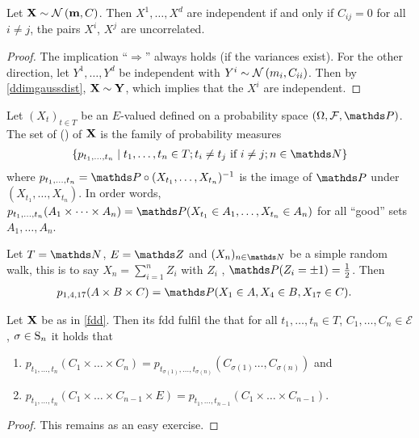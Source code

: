 \begin{prop}
	Let $\mathbf{X} \sim \mathcal{N}\left(\mathbf{m},C\right)$.
	Then $X^1, \dots, X^d$ are independent \RVs
	if and only if
	$C_{ij}=0$ for all $i\not = j$,
	\ie the pairs $X^i$, $X^j$ are uncorrelated.
\end{prop}
\begin{proof}
	The implication “$\Rightarrow$”
	always holds (if the variances exist).
	For the other direction,
	let $Y^1, \dots, Y^d$ be independent
	with $Y^i \sim \mathcal{N}\left(m_i,C_{ii}\right)$.
	Then by \ref{ddimgaussdist}, $\mathbf{X} \sim \mathbf{Y}$,
	which implies that the $X^i$ are independent.
\end{proof}

\begin{defi}\label{fdd}
	Let $(X_t)_{t \in T}$ be an $E$-valued \SP
	defined on a probability space $(\Omega,\mathcal{F},\Prob)$.
	The set of  ()
	of $\mathbf{X}$ is the family of probability measures
	\begin{align*}
		\{p_{t_1,\dots,t_n} \mid
			t_1,\dots,t_n \in T;
			\text{\(t_i \neq t_j\) if \(i \neq  j\)};
			n\in \N
		\}
	\end{align*}
	where $p_{t_1,\dots,t_n} = \Prob \circ (X_{t_1},\dots,X_{t_n})^{-1}$
	is the image of $\Prob$ under $(X_{t_1},\dots,X_{t_n})$.
	In order words,
	$p_{t_1,\dots,t_n}(A_1\times \dots \times A_n)
	= \Prob(X_{t_1}\in A_1,\dots,X_{t_n}\in A_n)$
	for all “good” sets $A_1,\dots,A_n$.
\end{defi}

\begin{bsp}
	Let $T=\N$, $E=\Z$ and $(X_n)_{n\in \N}$ be a simple random walk,
	this is to say $X_n=\sum_{i=1}^n Z_i$
	with $Z_i$ \iid, $\Prob(Z_i=\pm 1)=\frac{1}{2}$.
	Then
	\begin{align*}
		p_{1,4,17}(A\times B\times C)
		&= \Prob(X_1\in A, X_4\in B, X_{17}\in C).
	\qedhere
	\end{align*}
\end{bsp}

\begin{prop}
	Let $\mathbf{X}$ be as in \ref{fdd}.
	Then its fdd fulfil the 
	that for all $t_1, \dots, t_n \in T$,
	$C_1, \dots, C_n \in \mathcal{E}$,
	$\sigma \in \mathrm{S}_{n}$ it holds that
\begin{enumerate}[label={(C\arabic*)}]
\item $p_{t_1,\dots ,t_n}(C_1\times \dots \times C_n)
	= p_{t_{\sigma(1)}, \dots, t_{\sigma(n)}}(
		C_{\sigma(1)}\dots ,C_{\sigma(n)}
	)$
	and
\item $p_{t_1,\dots , t_n}(C_1\times \dots \times C_{n-1}\times E)
	= p_{t_1,\dots ,t_{n-1}}(C_1\times \dots \times C_{n-1})$.
\qedhere
\end{enumerate}
\end{prop}
\begin{proof}
	This remains as an easy exercise.
\end{proof}


